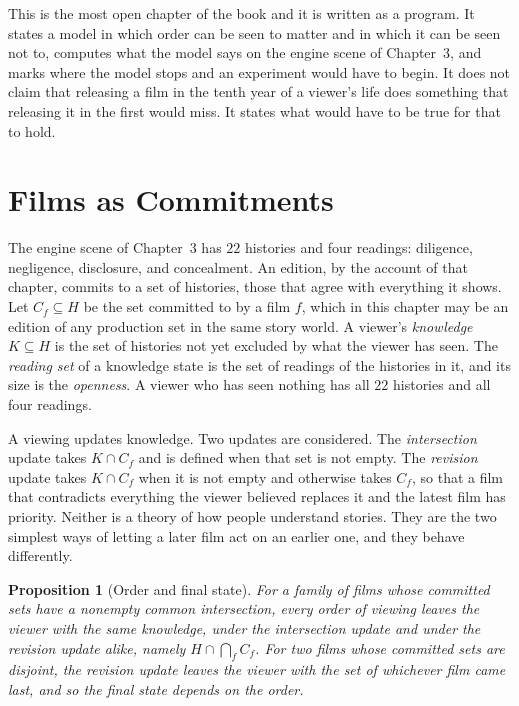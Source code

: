 \documentclass[11pt,twoside,openright]{book}
\theoremstyle{plain}
\newtheorem{proposition}[theorem]{Proposition}
\theoremstyle{definition}
\theoremstyle{remark}
\begin{document}
This is the most open chapter of the book and it is written as a program. It states a model in which order can be seen to matter and in which it can be seen not to, computes what the model says on the engine scene of Chapter~3, and marks where the model stops and an experiment would have to begin. It does not claim that releasing a film in the tenth year of a viewer's life does something that releasing it in the first would miss. It states what would have to be true for that to hold.

\section{Films as Commitments}\label{sec:commit14}

The engine scene of Chapter~3 has $22$ histories and four readings: diligence, negligence, disclosure, and concealment. An edition, by the account of that chapter, commits to a set of histories, those that agree with everything it shows. Let $C_f\subseteq H$ be the set committed to by a film $f$, which in this chapter may be an edition of any production set in the same story world. A viewer's \emph{knowledge} $K\subseteq H$ is the set of histories not yet excluded by what the viewer has seen. The \emph{reading set} of a knowledge state is the set of readings of the histories in it, and its size is the \emph{openness}. A viewer who has seen nothing has all $22$ histories and all four readings.

A viewing updates knowledge. Two updates are considered. The \emph{intersection} update takes $K\cap C_f$ and is defined when that set is not empty. The \emph{revision} update takes $K\cap C_f$ when it is not empty and otherwise takes $C_f$, so that a film that contradicts everything the viewer believed replaces it and the latest film has priority. Neither is a theory of how people understand stories. They are the two simplest ways of letting a later film act on an earlier one, and they behave differently.

\begin{proposition}[Order and final state]\label{prop:order14}
For a family of films whose committed sets have a nonempty common intersection, every order of viewing leaves the viewer with the same knowledge, under the intersection update and under the revision update alike, namely $H\cap\bigcap_fC_f$. For two films whose committed sets are disjoint, the revision update leaves the viewer with the set of whichever film came last, and so the final state depends on the order.
\end{proposition}
\end{document}
